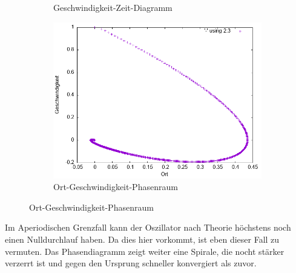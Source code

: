 \documentclass[
    oneside,
    ngerman,
    footinclude=false,
    captions=tableheading,
    DIV=12
]{scrartcl}
\begin{document}
\begin{figure}[H]
\begin{subfigure}[b]{0.45\textwidth}
                        \caption{Geschwindigkeit-Zeit-Diagramm}
                        \label{fig:VVA1(a)-001-1.5-v}
                    \end{subfigure}
                    \begin{subfigure}[b]{0.45\textwidth}
                        \centering
                        \includegraphics[width=\textwidth]{Bilddateien/VVA1(b)-001-1.5-xv.png}
                        \caption{Ort-Geschwindigkeit-Phasenraum}
                        \label{fig:VVA1(a)-001-1.5-xv}
                    \end{subfigure}
                \end{figure}
                Im Aperiodischen Grenzfall kann der Oszillator nach Theorie höchstens noch einen Nulldurchlauf haben. Da dies hier vorkommt, ist eben dieser Fall zu vermuten. Das Phasendiagramm zeigt weiter eine Spirale, die nocht stärker verzerrt ist und gegen den Ursprung schneller konvergiert als zuvor.
                \newpage
\end{document}

